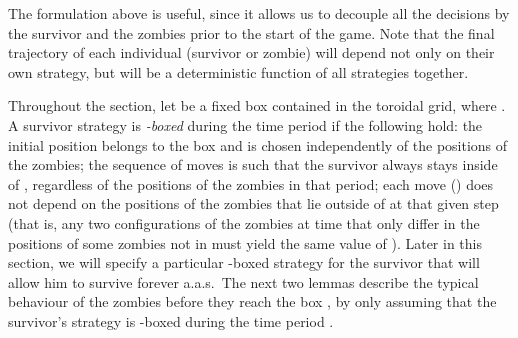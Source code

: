 \documentclass[12pt]{amsart}
\begin{document}
The formulation above is useful, since it allows us to decouple all the decisions by the survivor and the zombies prior to the start of the game. Note that the final trajectory of each individual
(survivor or zombie) will depend not only on their own strategy, but will be a deterministic function of all strategies together.

Throughout the section, let  be a fixed  box contained in the toroidal grid, where .
A survivor strategy is \emph{-boxed} during the
time period  if the following hold: the initial position  belongs to the box  and is chosen independently of the positions of the zombies; the sequence of moves
 is such that the survivor always stays inside of , regardless of the positions of the zombies in that period; each move  () does not depend on the
positions of the zombies that lie outside of  at that given step  (that is, any two configurations of the zombies at time  that only differ in the positions of some zombies not in  must
yield the same value of ). Later in this section, we will specify a particular -boxed strategy for the survivor that will allow him to survive forever a.a.s.\ The next two lemmas describe the typical behaviour of the zombies before they reach the box , by only assuming that the survivor's strategy is -boxed during the time period .
\end{document}
